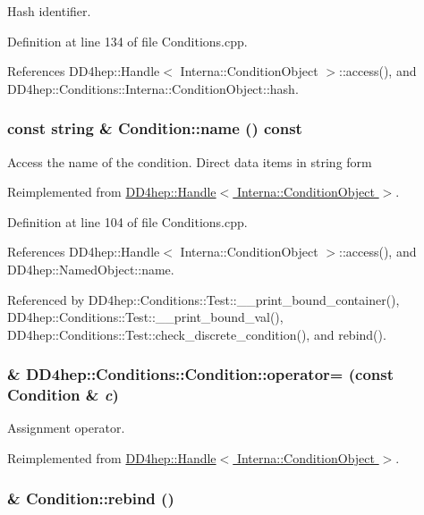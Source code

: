 Hash identifier. 

Definition at line 134 of file Conditions.cpp.

References DD4hep::Handle$<$ Interna::ConditionObject $>$::access(), and DD4hep::Conditions::Interna::ConditionObject::hash.\hypertarget{class_d_d4hep_1_1_conditions_1_1_condition_ab4b94316f4df66998b750336ab14dc90}{
\subsubsection[{name}]{\setlength{\rightskip}{0pt plus 5cm}const {\bf string} \& Condition::name () const}}
\label{class_d_d4hep_1_1_conditions_1_1_condition_ab4b94316f4df66998b750336ab14dc90}


Access the name of the condition. Direct data items in string form 

Reimplemented from \hyperlink{class_d_d4hep_1_1_handle_a9c62b8d37e0f2354bae0093498dc15a1}{DD4hep::Handle$<$ Interna::ConditionObject $>$}.

Definition at line 104 of file Conditions.cpp.

References DD4hep::Handle$<$ Interna::ConditionObject $>$::access(), and DD4hep::NamedObject::name.

Referenced by DD4hep::Conditions::Test::\_\-\_\-print\_\-bound\_\-container(), DD4hep::Conditions::Test::\_\-\_\-print\_\-bound\_\-val(), DD4hep::Conditions::Test::check\_\-discrete\_\-condition(), and rebind().\hypertarget{class_d_d4hep_1_1_conditions_1_1_condition_a270d3763943c0042ed991a310670ea5c}{
\subsubsection[{operator=}]{\& DD4hep::Conditions::Condition::operator= (const {\bf Condition} \& {\em c})}}
\label{class_d_d4hep_1_1_conditions_1_1_condition_a270d3763943c0042ed991a310670ea5c}


Assignment operator. 

Reimplemented from \hyperlink{class_d_d4hep_1_1_handle_a9bbf8f498df42e81ad26fb00233505a6}{DD4hep::Handle$<$ Interna::ConditionObject $>$}.\hypertarget{class_d_d4hep_1_1_conditions_1_1_condition_affc3f86e2c713e2122dabc3372d460f0}{
\subsubsection[{rebind}]{ \& Condition::rebind ()}}
\label{class_d_d4hep_1_1_conditions_1_1_condition_affc3f86e2c713e2122dabc3372d460f0}


